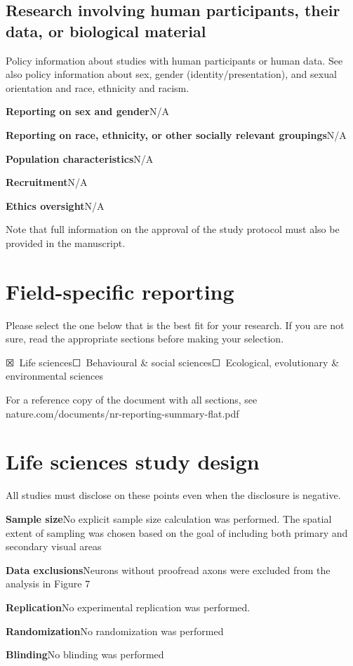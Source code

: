 \documentclass{article}
\newcommand{\yes}{\textsf{☒}}
\newcommand{\no}{\textsf{☐}}
\begin{document}
\subsection*{Research involving human participants, their data, or biological material}

Policy information about studies with human participants or human data. See also policy information about sex, gender (identity/presentation), and sexual orientation and race, ethnicity and racism.

\begin{hangpars}
\textbf{Reporting on sex and gender}\quad N/A

\textbf{Reporting on race, ethnicity, or other socially relevant groupings}\quad N/A

\textbf{Population characteristics}\quad N/A

\textbf{Recruitment}\quad N/A

\textbf{Ethics oversight}\quad N/A
\end{hangpars}

{\small Note that full information on the approval of the study protocol must also be provided in the manuscript.}

\section*{Field-specific reporting}

Please select the one below that is the best fit for your research. If you are not sure, read the appropriate sections before making your selection.

\noindent\yes\ Life sciences\qquad \no\ Behavioural \& social sciences\qquad \no\ Ecological, evolutionary \& environmental sciences

{\small For a reference copy of the document with all sections, see nature.com/documents/nr-reporting-summary-flat.pdf}

\section*{Life sciences study design}

All studies must disclose on these points even when the disclosure is negative.

\begin{hangpars}
\textbf{Sample size}\quad No explicit sample size calculation was performed. The spatial extent of sampling was chosen based on the goal of including both primary and secondary visual areas

\textbf{Data exclusions}\quad Neurons without proofread axons were excluded from the analysis in Figure 7

\textbf{Replication}\quad No experimental replication was performed.

\textbf{Randomization}\quad No randomization was performed

\textbf{Blinding}\quad No blinding was performed
\end{hangpars}
\end{document}
